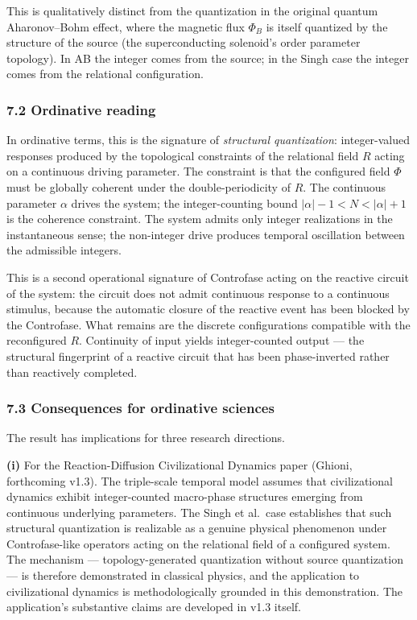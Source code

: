 \documentclass[
  11pt,
  a4paper,
]{article}
\begin{document}
This is qualitatively distinct from the quantization in the original
quantum Aharonov--Bohm effect, where the magnetic flux \(\Phi_B\) is
itself quantized by the structure of the source (the superconducting
solenoid's order parameter topology). In AB the integer comes from the
source; in the Singh case the integer comes from the relational
configuration.

\subsubsection{7.2 Ordinative reading}\label{ordinative-reading}

In ordinative terms, this is the signature of \emph{structural
quantization}: integer-valued responses produced by the topological
constraints of the relational field \(R\) acting on a continuous driving
parameter. The constraint is that the configured field \(\Phi\) must be
globally coherent under the double-periodicity of \(R\). The continuous
parameter \(\alpha\) drives the system; the integer-counting bound
\(|\alpha| - 1 < N < |\alpha| + 1\) is the coherence constraint. The
system admits only integer realizations in the instantaneous sense; the
non-integer drive produces temporal oscillation between the admissible
integers.

This is a second operational signature of Controfase acting on the
reactive circuit of the system: the circuit does not admit continuous
response to a continuous stimulus, because the automatic closure of the
reactive event has been blocked by the Controfase. What remains are the
discrete configurations compatible with the reconfigured \(R\).
Continuity of input yields integer-counted output --- the structural
fingerprint of a reactive circuit that has been phase-inverted rather
than reactively completed.

\subsubsection{7.3 Consequences for ordinative
sciences}\label{consequences-for-ordinative-sciences}

The result has implications for three research directions.

\textbf{(i)} For the Reaction-Diffusion Civilizational Dynamics paper
(Ghioni, forthcoming v1.3). The triple-scale temporal model assumes that
civilizational dynamics exhibit integer-counted macro-phase structures
emerging from continuous underlying parameters. The Singh et al.~case
establishes that such structural quantization is realizable as a genuine
physical phenomenon under Controfase-like operators acting on the
relational field of a configured system. The mechanism ---
topology-generated quantization without source quantization --- is
therefore demonstrated in classical physics, and the application to
civilizational dynamics is methodologically grounded in this
demonstration. The application's substantive claims are developed in
v1.3 itself.
\end{document}
